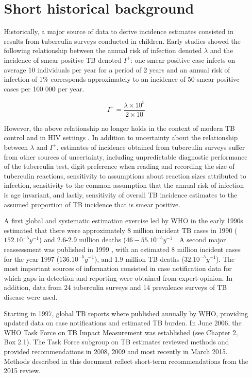\section{Short historical background}

Historically, a major source of data to derive incidence estimates consisted in results from tuberculin surveys conducted in children\cite{Styblo1985}. Early studies showed  the following relationship between the annual risk of infection denoted $\lambda$ and the incidence of smear positive TB denoted $I^+$: one smear positive case infects on average 10 individuals per year for a period of 2 years and an annual risk of infection of 1\% corresponds approximately to an incidence of 50 smear positive cases per 100 000 per year.

$$I^+ = \frac{\lambda \times 10^5}{2 \times 10}$$

However, the above relationship no longer holds in the context of modern TB control and in HIV settings \cite{18235886}. In addition to uncertainty about the relationship between $\lambda$ and $I^+$, estimates of incidence obtained from tuberculin surveys suffer from other sources of uncertainty, including unpredictable diagnostic performance of the tuberculin test, digit preference when reading and recording the size of tuberculin reactions, sensitivity to assumptions about reaction sizes attributed to infection, sensitivity to the common assumption that the annual risk of infection is age invariant, and lastly, sensitivity of overall TB incidence estimates to the assumed proportion of TB incidence that is smear positive. 

A first global and systematic estimation exercise led by WHO in the early 1990s estimated that there were approximately 8 million incident TB cases in 1990 ($152.10^{-5} y^{-1}$) and 2.6-2.9 million deaths ($46-55.10^{-5} y^{-1}$ \cite{1600578}. A second major reassessment was published in 1999 \cite{10517722}, with an estimated 8 million incident  cases for the year 1997 ($136.10^{-5} y^{-1}$), and 1.9 million TB deaths ($32.10^{-5} y^{-1}$). The most important sources of information consisted in case notification data for which gaps in detection and reporting were obtained from expert opinion. In addition, data from 24 tuberculin surveys and 14 prevalence surveys of TB disease were used.

Starting in 1997, global TB reports where published annually by WHO, providing updated data on case notifications and estimated TB burden. In June 2006, the WHO Task Force on TB Impact Measurement was established \cite{18201929} (see Chapter 2, Box 2.1). The Task Force subgroup on TB estimates reviewed methods and provided recommendations in 2008, 2009 and most recently in March 2015. Methods described in this document reflect short-term recommendations from the 2015 review. 




  
  
  
  
  
  
  
  
  
  
  
